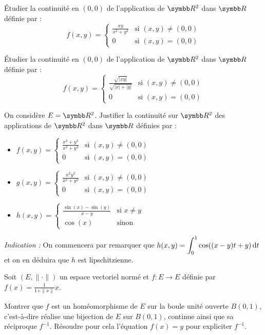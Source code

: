 \begin{exercice}
    Étudier la continuité en $(0,0)$ de l'application de $\R^{2}$ dans $\R$ définie par :
    \[f(x,y) = \begin{cases} \frac{xy}{x^{2}+y^{2}} & \text{si } (x,y) \neq (0,0) \\ 0 & \text{si } (x,y) = (0,0) \end{cases}\]
\end{exercice}

\begin{exercice}
    Étudier la continuité en $(0,0)$ de l'application de $\R^{2}$ dans $\R$ définie par :
    \[f(x,y) = \begin{cases} \frac{\sqrt{|xy|}}{\sqrt{|x|+|y|}} & \text{si } (x,y) \neq (0,0) \\ 0 & \text{si } (x,y) = (0,0) \end{cases}\]
\end{exercice}

\begin{exercice}
    On considère $E=\R^{2}$. Justifier la continuité sur $\R^{2}$ des applications de $\R^{2}$ dans $\R$ définies par :
    \begin{itemize}
        \item $f(x,y) = \begin{cases} \frac{x^{3}+y^{3}}{x^{2}+y^{2}} & \text{si } (x,y) \neq (0,0) \\ 0 & \text{si } (x,y) = (0,0) \end{cases}$
        \item $g(x,y) = \begin{cases} \frac{x^{2}y^{2}}{x^{2}+y^{2}} & \text{si } (x,y) \neq (0,0) \\ 0 & \text{si } (x,y) = (0,0) \end{cases}$
        \item $h(x,y) = \begin{cases} \frac{\sin(x)-\sin(y)}{x-y} & \text{si } x \neq y \\ \cos(x) & \text{sinon} \end{cases}$
    \end{itemize}
    \textit{Indication :} On commencera par remarquer que $\displaystyle h(x,y) = \int_{0}^{1} \cos((x-y)t+y) \,\mathrm{d}t$
    et on en déduira que $h$ est lipschitzienne.
\end{exercice}

\begin{exercice}
    Soit $(E, \| \cdot \|)$ un espace vectoriel normé et $f: E \rightarrow E$ définie par $f(x) = \frac{1}{1+\|x\|}x$.

    Montrer que $f$ est un homéomorphisme de $E$ sur la boule unité ouverte $B(0,1)$, 
    c'est-à-dire réalise une bijection de $E$ sur $B(0,1)$, continue ainsi que sa réciproque $f^{-1}$.
    Résoudre pour cela l'équation $f(x)=y$ pour expliciter $f^{-1}$.
\end{exercice}

